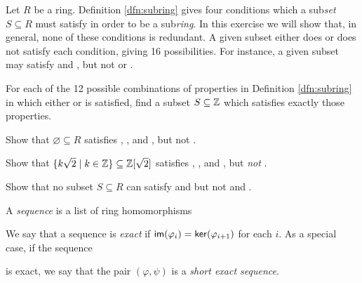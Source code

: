 \begin{exercise}
Let \(R\) be a ring. Definition \ref{dfn:subring} gives four conditions which a sub\emph{set} \(S \subseteq R\) must satisfy in order to be a sub\emph{ring}. In this exercise we will show that, in general, none of these conditions is redundant. A given subset either does or does not satisfy each condition, giving 16 possibilities. For instance, a given subset may satisfy  and , but not  or .
\begin{proplist}
\item For each of the 12 possible combinations of properties in Definition \ref{dfn:subring} in which either  or  is  satisfied, find a subset \(S \subseteq \mathbb{Z}\) which satisfies exactly those properties.
\item Show that \(\varnothing \subseteq R\) satisfies , , and , but not .
\item Show that \(\{ k\sqrt{2} \mid k \in \mathbb{Z} \} \subseteq \mathbb{Z}[\sqrt{2}]\) satisfies , , and , but \emph{not} .
\item Show that no subset \(S \subseteq R\) can satisfy  and  but not  and .
\end{proplist}
\end{exercise}

\begin{dfn}
A \emph{sequence} is a list of ring homomorphisms
\begin{center}
\end{center}
We say that a sequence is \emph{exact}  if \( \mathsf{im}(\varphi_i)  =  \mathsf{ker}(\varphi_{i+1}) \) for each \(i\). As a special case, if the sequence
\begin{center}
\end{center}
is exact, we say that the pair \((\varphi, \psi)\) is a  \emph{short exact sequence}.
\end{dfn}

